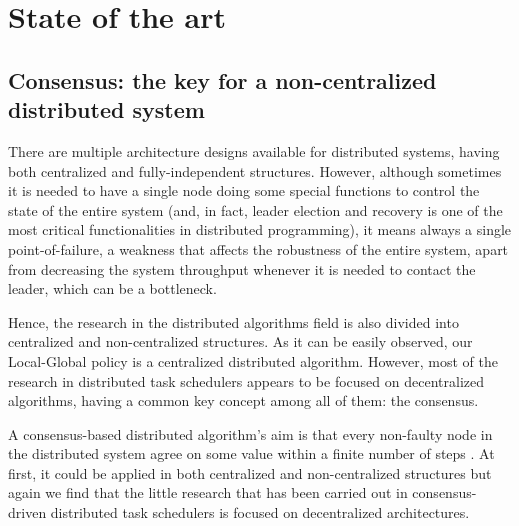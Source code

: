 
\chapter{State of the art} %

\label{Chapter2} %


\section{Consensus: the key for a non-centralized distributed system}

There are multiple architecture designs available for distributed systems, having both centralized and fully-independent structures. However, although sometimes it is needed to have a single node doing some special functions to control the state of the entire system (and, in fact, leader election and recovery is one of the most critical functionalities in distributed programming), it means always a single point-of-failure, a weakness that affects the robustness of the entire system, apart from decreasing the system throughput whenever it is needed to contact the leader, which can be a bottleneck.

Hence, the research in the distributed algorithms field is also divided into centralized and non-centralized structures. As it can be easily observed, our Local-Global policy is a centralized distributed algorithm. However, most of the research in distributed task schedulers appears to be focused on decentralized algorithms, having a common key concept among all of them: the consensus.

A consensus-based distributed algorithm's aim is that every non-faulty node in the distributed system agree on some value within a finite number of steps \citep{Tanenbaum:2006:DSP:1202502}. At first, it could be applied in both centralized and non-centralized structures but again we find that the little research that has been carried out in consensus-driven distributed task schedulers is focused on decentralized architectures.



